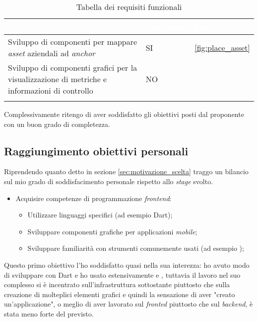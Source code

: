 {
    \setlength{\freewidth}{\dimexpr\textwidth-10\tabcolsep}
    \renewcommand{\arraystretch}{1.5}
    \centering
    \setlength{\aboverulesep}{0pt}
    \setlength{\belowrulesep}{0pt}
    \begin{longtable}{C{.8\freewidth} C{.162\freewidth} C{.115\freewidth}}
       \toprule
    \textcolor{white}{\textbf{Obiettivo}}&
    \textcolor{white}{\textbf{Raggiunto}}&
    \textcolor{white}{\textbf{Fonte}}\\
    \toprule
    \endhead
    
    Sviluppo di componenti per mappare \textit{asset} aziendali ad \textit{anchor} & SI & \ref{fig:place_asset}\\
    Sviluppo di componenti grafici per la visualizzazione di metriche e informazioni di controllo& NO & \\

    \bottomrule
    \caption{Tabella dei requisiti funzionali}
    \end{longtable}
}
Complessivamente ritengo di aver soddisfatto gli obiettivi posti dal proponente con un buon grado di completezza.

\subsection{Raggiungimento obiettivi personali}
Riprendendo quanto detto in sezione \ref{sec:motivazione_scelta} traggo un bilancio sul mio grado di soddisfacimento personale rispetto allo \textit{stage} svolto.

\begin{itemize}
  \item Acquisire competenze di programmazione \textit{frontend}:
      \begin{itemize}
          \item Utilizzare linguaggi specifici (ad esempio Dart);
          \item Sviluppare componenti grafiche per applicazioni \textit{mobile};
          \item Sviluppare familiarità con strumenti comunemente usati (ad esempio \vsc);
      \end{itemize}
\end{itemize}

Questo primo obiettivo l'ho soddisfatto quasi nella sua interezza: ho avuto modo di sviluppare con Dart e ho usato estensivamente \vsc{} e \astudio{}, tuttavia il lavoro nel suo complesso si è incentrato sull'infrastruttura sottostante piuttosto che sulla creazione di molteplici elementi grafici e quindi la sensazione di aver "creato un'applicazione", o meglio di aver lavorato sul \textit{fronted} piuttosto che sul \textit{backend}, è stata meno forte del previsto.

